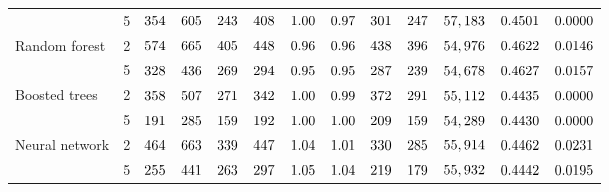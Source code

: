\documentclass[11pt]{article}
\begin{document}
\begin{table}[t]
{{\begin{tabular}{@{}l c rr rr rr rr rr r@{}}
 & 5 & $354$ & $605$ & $243$ & $408$ & $1.00$ & $0.97$ & $301$ & $247$ & $57,183$ & $0.4501$ & $0.0000$ \\
\addlinespace
Random forest & 2 & $574$ & $665$ & $405$ & $448$ & $0.96$ & $0.96$ & $438$ & $396$ & $54,976$ & $0.4622$ & $0.0146$ \\
 & 5 & $328$ & $436$ & $269$ & $294$ & $0.95$ & $0.95$ & $287$ & $239$ & $54,678$ & $0.4627$ & $0.0157$ \\
\addlinespace
Boosted trees & 2 & $358$ & $507$ & $271$ & $342$ & $1.00$ & $0.99$ & $372$ & $291$ & $55,112$ & $0.4435$ & $0.0000$ \\
 & 5 & $191$ & $285$ & $159$ & $192$ & $1.00$ & $1.00$ & $209$ & $159$ & $54,289$ & $0.4430$ & $0.0000$ \\
\addlinespace
Neural network & 2 & $464$ & $663$ & $339$ & $447$ & $1.04$ & $1.01$ & $330$ & $285$ & $55,914$ & $0.4462$ & $0.0231$ \\
 & 5 & $255$ & $441$ & $263$ & $297$ & $1.05$ & $1.04$ & $219$ & $179$ & $55,932$ & $0.4442$ & $0.0195$ \\
\bottomrule
\end{tabular}}}
\end{table}
\end{document}
